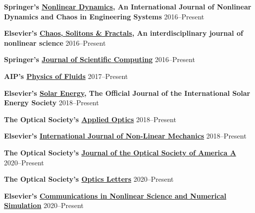 \documentclass[10pt]{article}
\newcommand{\blankline}{\quad\pagebreak[3]}
\begin{document}
\blankline

\textbf{Springer's \href{http://link.springer.com/journal/11071}{Nonlinear Dynamics}, An International Journal of Nonlinear Dynamics and Chaos in Engineering Systems} \hfill 2016--Present

\blankline

\textbf{Elsevier's \href{http://www.journals.elsevier.com/chaos-solitons-and-fractals/}{Chaos, Solitons \& Fractals}, An interdisciplinary journal of nonlinear science} \hfill 2016--Present

\blankline

\textbf{Springer's \href{http://link.springer.com/journal/10915}{Journal of Scientific Computing}} \hfill 2016--Present

\blankline

\textbf{AIP's \href{http://aip.scitation.org/journal/phf}{Physics of Fluids}} \hfill 2017--Present

\blankline

\textbf{Elsevier's \href{https://www.journals.elsevier.com/solar-energy/}{Solar Energy}, The Official Journal of the International Solar Energy Society} \hfill 2018--Present

\blankline

\textbf{The Optical Society's \href{https://www.osapublishing.org/ao/home.cfm}{Applied Optics}} \hfill 2018--Present

\blankline

\textbf{Elsevier's \href{https://www.journals.elsevier.com/international-journal-of-non-linear-mechanics}{International Journal of Non-Linear Mechanics}} \hfill 2018--Present

\blankline

\textbf{The Optical Society's \href{https://www.osapublishing.org/josaa/home.cfm}{Journal of the Optical Society of America A}} \hfill 2020--Present

\blankline

\textbf{The Optical Society's \href{https://www.osapublishing.org/ol/home.cfm}{Optics Letters}} \hfill 2020--Present

\blankline

\textbf{Elsevier's \href{https://www.sciencedirect.com/journal/communications-in-nonlinear-science-and-numerical-simulation}{Communications in Nonlinear Science and Numerical Simulation}} \hfill 2020--Present


\end{document}
